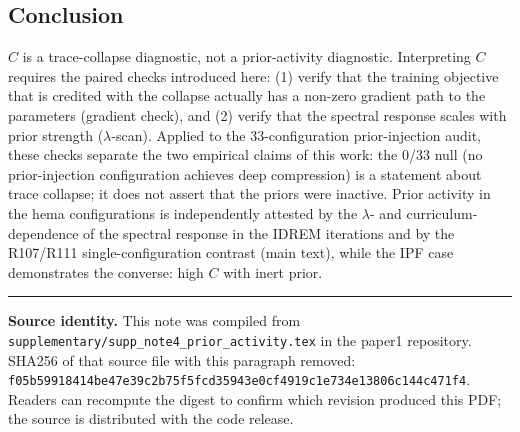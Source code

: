 \documentclass[11pt,a4paper]{article}
\begin{document}
\subsection*{Conclusion}

$C$ is a trace-collapse diagnostic, not a prior-activity diagnostic. Interpreting $C$ requires the paired checks introduced here: (1) verify that the training objective that is credited with the collapse actually has a non-zero gradient path to the parameters (gradient check), and (2) verify that the spectral response scales with prior strength ($\lambda$-scan). Applied to the 33-configuration prior-injection audit, these checks separate the two empirical claims of this work: the 0/33 null (no prior-injection configuration achieves deep compression) is a statement about trace collapse; it does not assert that the priors were inactive. Prior activity in the hema configurations is independently attested by the $\lambda$- and curriculum-dependence of the spectral response in the IDREM iterations and by the R107/R111 single-configuration contrast (main text), while the IPF case demonstrates the converse: high $C$ with inert prior.

\vspace{10pt}
\noindent\rule{\textwidth}{0.4pt}
\footnotesize\textbf{Source identity.} This note was compiled from \texttt{supplementary/supp\_note4\_prior\_activity.tex} in the paper1 repository. SHA256 of that source file with this paragraph removed: \texttt{f05b59918414be47e39c2b75f5fcd35943e0cf4919c1e734e13806c144c471f4}. Readers can recompute the digest to confirm which revision produced this PDF; the source is distributed with the code release.
\end{document}
